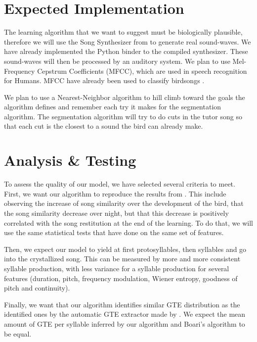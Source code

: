 \documentclass[a4paper]{article}
\begin{document}
\section*{Expected Implementation}

The learning algorithm that we want to suggest must be biologically plausible,
therefore we will use the Song Synthesizer from \textcite{boari_automatic_2015}
to generate real sound-waves. We have already implemented the Python binder to
the compiled synthesizer. These sound-waves will then be processed by an
auditory system. We plan to use Mel-Frequency Cepstrum Coefficients
(MFCC), which are used in speech recognition for Humans.
MFCC have already been used to classify birdsongs \parencite{chou_studies_2008}.

We plan to use a Nearest-Neighbor algorithm to hill climb toward the goals the
algorithm defines and remember each try it makes for the segmentation algorithm.
The segmentation algorithm will try to do cuts in the tutor song so that each
cut is the closest to a sound the bird can already make.

\section*{Analysis \& Testing}

To assess the quality of our model, we have selected several criteria to meet.
First, we want our algorithm to reproduce the results from
\textcite{deregnaucourt_how_2005}. This include observing the increase of song
similarity \parencite{tchernichovski_procedure_2000} over the development of the
bird, that the song similarity decrease over night, but that this decrease is
positively correlated with the song restitution at the end of the learning. To
do that, we will use the same statistical tests that
\textcite{deregnaucourt_how_2005} have done on the same set of features.

Then, we expect our model to yield at first protosyllables, then syllables and
go into the crystallized song. This can be measured by more and more consistent
syllable production, with less variance for a syllable production for several
features (duration, pitch, frequency modulation, Wiener entropy, goodness of
pitch and continuity).

Finally, we want that our algorithm identifies similar GTE distribution as the
identified ones by the automatic GTE extractor made by
\textcite{boari_automatic_2015}. We expect the mean amount of GTE per syllable
inferred by our algorithm and Boari's algorithm to be equal.
\end{document}
